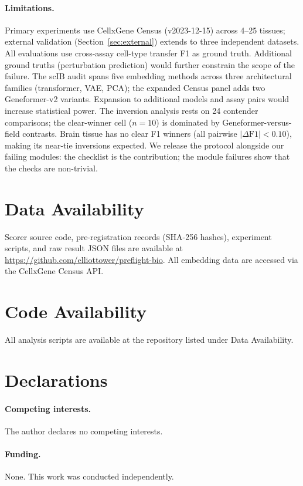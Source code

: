 \documentclass[11pt]{article}
\begin{document}
\paragraph{Limitations.} Primary experiments use CellxGene Census (v2023-12-15) across 4--25 tissues; external validation (Section~\ref{sec:external}) extends to three independent datasets. All evaluations use cross-assay cell-type transfer F1 as ground truth. Additional ground truths (perturbation prediction) would further constrain the scope of the failure. The scIB audit spans five embedding methods across three architectural families (transformer, VAE, PCA); the expanded Census panel adds two Geneformer-v2 variants. Expansion to additional models and assay pairs would increase statistical power. The inversion analysis rests on 24 contender comparisons; the clear-winner cell ($n = 10$) is dominated by Geneformer-versus-field contrasts. Brain tissue has no clear F1 winners (all pairwise $|\Delta\text{F1}| < 0.10$), making its near-tie inversions expected. We release the protocol alongside our failing modules: the checklist is the contribution; the module failures show that the checks are non-trivial.

\section*{Data Availability}

Scorer source code, pre-registration records (SHA-256 hashes), experiment scripts, and raw result JSON files are available at \url{https://github.com/elliottower/preflight-bio}. All embedding data are accessed via the CellxGene Census API.

\section*{Code Availability}

All analysis scripts are available at the repository listed under Data Availability.

\section*{Declarations}

\paragraph{Competing interests.} The author declares no competing interests.

\paragraph{Funding.} None. This work was conducted independently.
\end{document}
